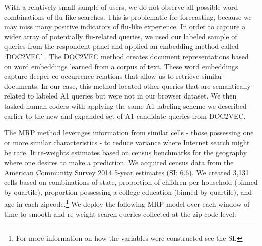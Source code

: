\documentclass[fleqn,10pt]{wlscirep}
\begin{document}

With a relatively small sample of users, we do not observe all possible word combinations of flu-like searches. This is problematic for forecasting, because we may miss many positive indicators of flu-like experience. In order to capture a wider array of potentially flu-related queries, we used our labeled sample of queries from the respondent panel and applied an embedding method called `DOC2VEC' \cite{le_and_mikolov_2014}. The DOC2VEC method creates document representations based on word embeddings learned from a corpus of text. These word embeddings capture deeper co-occurrence relations that allow us to retrieve similar documents. In our case, this method located other queries that are semantically related to labeled A1 queries but were not in our browser dataset. We then tasked human coders with applying the same A1 labeling scheme we described earlier to the new and expanded set of A1 candidate queries from DOC2VEC. 

The MRP method leverages information from similar cells - those possessing one or more similar characteristics - to reduce variance where Internet search might be rare. It re-weights estimates based on census benchmarks for the geography where one desires to make a prediction. We acquired census data from the American Community Survey 2014 5-year estimates (SI: 6.6). We created 3,131 cells based on combinations of state, proportion of children per household (binned by quartile), proportion possessing a college education (binned by quartile), and age in each zipcode.\footnote{For more information on how the variables were constructed see the SI.}  We deploy the following MRP model over each window of time to smooth and re-weight search queries collected at the zip code level:
\end{document}
